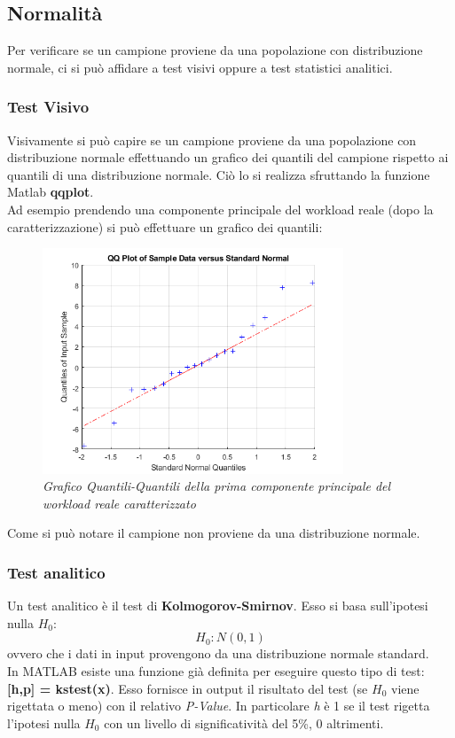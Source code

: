 \subsection{Normalità}
Per verificare se un campione proviene da una popolazione con distribuzione normale, ci si può affidare a test visivi oppure a test statistici analitici.
\subsubsection{Test Visivo}
Visivamente si può capire se un campione proviene da una popolazione con distribuzione normale effettuando un grafico dei quantili del campione rispetto ai quantili di una distribuzione normale. Ciò lo si realizza sfruttando la funzione Matlab \textbf{qqplot}.
\\Ad esempio prendendo una componente principale del workload reale (dopo la caratterizzazione) si può effettuare un grafico dei quantili:
\begin{figure}[H]
	\centering
	\includegraphics[width=0.8\textwidth]{img/hw3/test_visivo.png}
	\caption{\textit{Grafico Quantili-Quantili della prima componente principale del workload reale caratterizzato}}
\end{figure}
Come si può notare il campione non proviene da una distribuzione normale.
\subsubsection{Test analitico}
Un test analitico è il test di \textbf{Kolmogorov-Smirnov}. Esso si basa sull'ipotesi nulla $H_0$:
\begin{equation*}
	H_0 : N(0,1) 
\end{equation*}
ovvero che i dati in input provengono da una distribuzione normale standard.
\\In MATLAB esiste una funzione già definita per eseguire questo tipo di test: \textbf{[h,p] = kstest(x)}. Esso fornisce in output il risultato del test (se $H_0$ viene rigettata o meno) con il relativo \textit{P-Value}. In particolare \textit{h} è 1 se il test rigetta l'ipotesi nulla $H_0$ con un livello di significatività del 5\%, 0 altrimenti.
